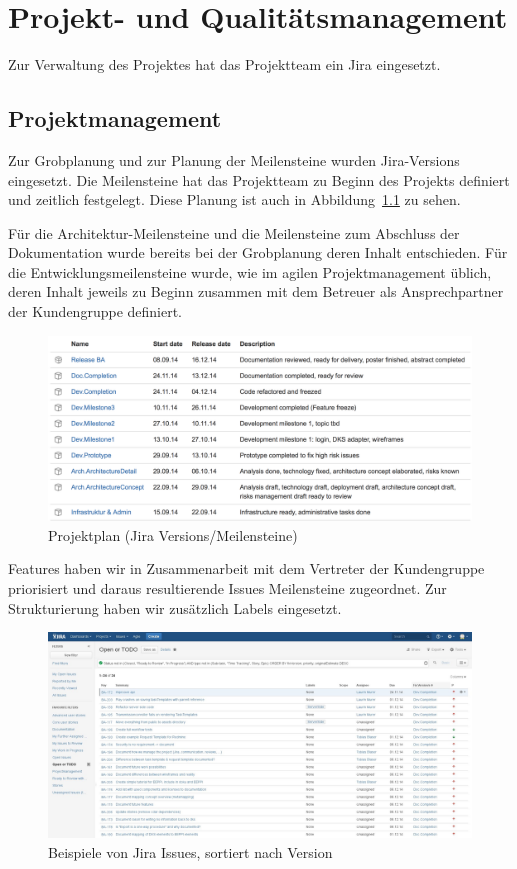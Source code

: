 \chapter{Projekt- und Qualitätsmanagement}
	\label{cap:projectmanagement}
	
	Zur Verwaltung des Projektes hat das Projektteam ein Jira eingesetzt.
	
	\section{Projektmanagement}
		Zur Grobplanung und zur Planung der Meilensteine wurden Jira-Versions eingesetzt.
		Die Meilensteine hat das Projektteam zu Beginn des Projekts definiert und zeitlich festgelegt.
		Diese Planung ist auch in Abbildung~\ref{fig:jiraVersions} zu sehen.
		
		Für die Architektur-Meilensteine und die Meilensteine zum Abschluss der Dokumentation wurde bereits bei der Grobplanung deren Inhalt entschieden.
		Für die Entwicklungsmeilensteine wurde, wie im agilen Projektmanagement üblich,
		deren Inhalt jeweils zu Beginn zusammen mit dem Betreuer als Ansprechpartner der Kundengruppe definiert.
		
		\begin{figure}[H]
			\includegraphics[width=\textwidth]{projectPlan/media/img/jiraVersions.jpg}
			\centering
			\caption{Projektplan (Jira Versions/Meilensteine)}
			\label{fig:jiraVersions}
		\end{figure}
		
		Features haben wir in Zusammenarbeit mit dem Vertreter der Kundengruppe priorisiert und daraus resultierende Issues Meilensteine zugeordnet.
		Zur Strukturierung haben wir zusätzlich Labels eingesetzt.
		
		\begin{figure}[H]
			\includegraphics[width=\textwidth]{projectPlan/media/img/jiraIssuesOpenOrTodo.jpg}
			\centering
			\caption{Beispiele von Jira Issues, sortiert nach Version}
			\label{fig:jiraIssuesOpenOrTodo}
		\end{figure}
		
